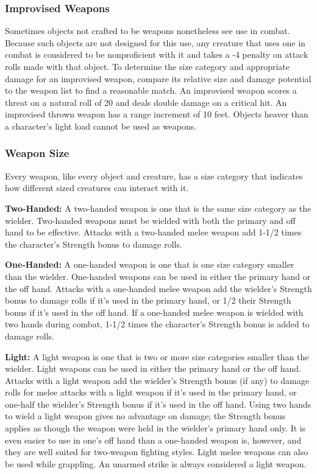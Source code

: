\subsubsection{Improvised Weapons}
Sometimes objects not crafted to be weapons nonetheless see use in combat. Because such objects are not designed for this use, any creature that uses one in combat is considered to be nonproficient with it and takes a -4 penalty on attack rolls made with that object. To determine the size category and appropriate damage for an improvised weapon, compare its relative size and damage potential to the weapon list to find a reasonable match. An improvised weapon scores a threat on a natural roll of 20 and deals double damage on a critical hit. An improvised thrown weapon has a range increment of 10 feet. Objects heaver than a character's light load cannot be used as weapons.

\subsubsection{Weapon Size}
Every weapon, like every object and creature, has a size category that indicates how different sized creatures can interact with it.

\textbf{Two-Handed:} A two-handed weapon is one that is the same size category as the wielder. Two-handed weapons must be wielded with both the primary and off hand to be effective. Attacks with a two-handed melee weapon add 1-1/2 times the character's Strength bonus to damage rolls.

\textbf{One-Handed:} A one-handed weapon is one that is one size category smaller than the wielder. One-handed weapons can be used in either the primary hand or the off hand. Attacks with a one-handed melee weapon add the wielder's Strength bonus to damage rolls if it's used in the primary hand, or 1/2 their Strength bonus if it's used in the off hand. If a one-handed melee weapon is wielded with two hands during combat, 1-1/2 times the character's Strength bonus is added to damage rolls. 

\textbf{Light:} A light weapon is one that is two or more size categories smaller than the wielder. Light weapons can be used in either the primary hand or the off hand. Attacks with a light weapon add the wielder's Strength bonus (if any) to damage rolls for melee attacks with a light weapon if it's used in the primary hand, or one-half the wielder's Strength bonus if it's used in the off hand. Using two hands to wield a light weapon gives no advantage on damage; the Strength bonus applies as though the weapon were held in the wielder's primary hand only. It is even easier to use in one's off hand than a one-handed weapon is, however, and they are well suited for two-weapon fighting styles. Light melee weapons can also be used while grappling. An unarmed strike is always considered a light weapon.


